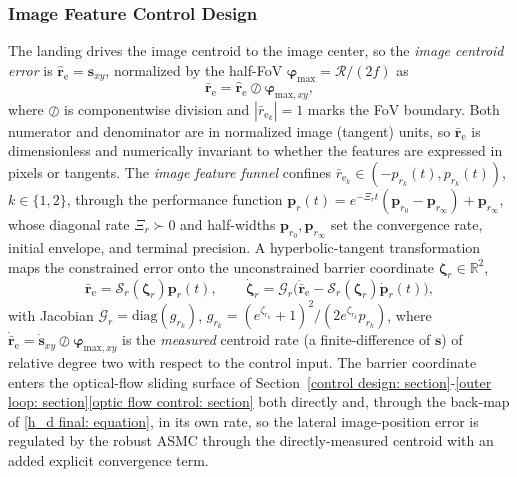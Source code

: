\documentclass{IEEEtaes}
\theoremstyle{definition}
\theoremstyle{remark}
\begin{document}
\subsubsection{Image Feature Control Design} \label{image point control: section}
The landing drives the image centroid to the image center, so the \emph{image centroid error} is $\hat{\boldsymbol{r}}_\text{e}=\boldsymbol{s}_{xy}$, normalized by the half-FoV $\boldsymbol{\varphi}_\text{max}=\mathcal{R}/(2f)$ as
\begin{equation} \label{normalized error: equation}
    \bar{\boldsymbol{r}}_\text{e} = \hat{\boldsymbol{r}}_\text{e}\oslash\boldsymbol{\varphi}_{\text{max},xy},
\end{equation}
where $\oslash$ is componentwise division and $|\bar{r}_{\text{e}_k}|=1$ marks the FoV boundary. Both numerator and denominator are in normalized image (tangent) units, so $\bar{\boldsymbol{r}}_\text{e}$ is dimensionless and numerically invariant to whether the features are expressed in pixels or tangents. The \emph{image feature funnel} confines $\bar{r}_{\text{e}_k}\in(-p_{r_k}(t),p_{r_k}(t))$, $k\in\{1,2\}$, through the performance function $\boldsymbol{p}_r(t)=e^{-\Xi_r t}(\boldsymbol{p}_{r_0}-\boldsymbol{p}_{r_\infty})+\boldsymbol{p}_{r_\infty}$, whose diagonal rate $\Xi_r\succ 0$ and half-widths $\boldsymbol{p}_{r_0},\boldsymbol{p}_{r_\infty}$ set the convergence rate, initial envelope, and terminal precision. A hyperbolic-tangent transformation maps the constrained error onto the unconstrained barrier coordinate $\boldsymbol{\zeta}_r\in\mathbb{R}^2$,
\begin{equation} \label{image funnel transform: equation}
    \bar{\boldsymbol{r}}_\text{e}=\mathcal{S}_r(\boldsymbol{\zeta}_r)\boldsymbol{p}_r(t),\qquad \dot{\boldsymbol{\zeta}}_r=\mathcal{G}_r\big(\dot{\bar{\boldsymbol{r}}}_\text{e}-\mathcal{S}_r(\boldsymbol{\zeta}_r)\dot{\boldsymbol{p}}_r(t)\big),
\end{equation}
with Jacobian $\mathcal{G}_r=\mathrm{diag}(g_{r_k})$, $g_{r_k}=(e^{\zeta_{r_k}}+1)^2/(2e^{\zeta_{r_k}}p_{r_k})$, where $\dot{\bar{\boldsymbol{r}}}_\text{e}=\dot{\boldsymbol{s}}_{xy}\oslash\boldsymbol{\varphi}_{\text{max},xy}$ is the \emph{measured} centroid rate (a finite-difference of $\boldsymbol{s}$) of relative degree two with respect to the control input. The barrier coordinate enters the optical-flow sliding surface of Section~\ref{control design: section}-\ref{outer loop: section}\ref{optic flow control: section} both directly and, through the back-map of \eqref{h_d final: equation}, in its own rate, so the lateral image-position error is regulated by the robust ASMC through the directly-measured centroid with an added explicit convergence term.
\end{document}
